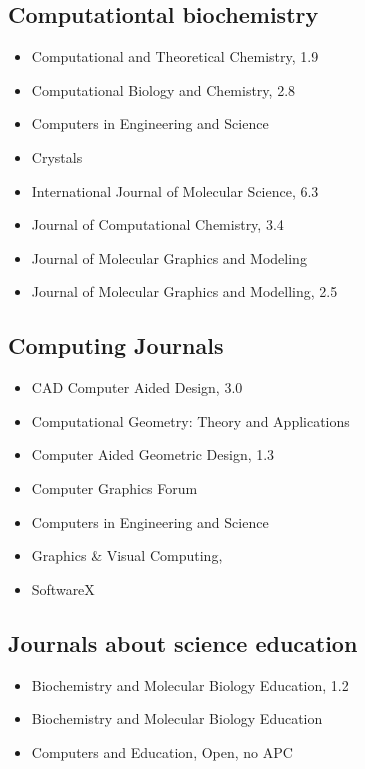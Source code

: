 \documentclass[10pt,letterpaper]{article}
\begin{document}
\begin{itemize}
\begin{itemize}
\subsection{Computationtal biochemistry}

\begin{itemize}
  \item Computational and Theoretical Chemistry, 1.9
  \item Computational Biology and Chemistry, 2.8 
  \item Computers in Engineering and Science
  \item Crystals
  \item International Journal of Molecular Science, 6.3
  \item Journal of Computational Chemistry, 3.4
  \item Journal of Molecular Graphics and Modeling
  \item Journal of Molecular Graphics and Modelling, 2.5
\end{itemize}


\subsection{Computing Journals}

\begin{itemize}
  \item CAD Computer Aided Design, 3.0    
  \item Computational Geometry: Theory and Applications  
  \item Computer Aided Geometric Design, 1.3
  \item Computer Graphics Forum
  \item Computers in Engineering and Science
  \item Graphics \& Visual Computing,
  \item SoftwareX
\end{itemize}


\subsection{Journals about science education}

\begin{itemize}
  \item Biochemistry and Molecular Biology Education, 1.2
  \item Biochemistry and Molecular Biology Education
  \item Computers and Education, Open, no APC  
\end{itemize}



\end{itemize}
\end{itemize}
\end{document}
